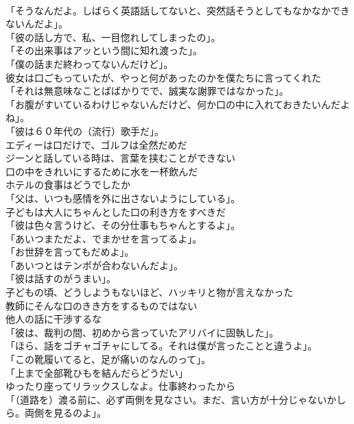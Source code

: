 \documentclass[8pt]{extreport}
\begin{document}
\begin{CJK}{UTF8}{min}
\\	「そうなんだよ。しばらく英語話してないと、突然話そうとしてもなかなかできないんだよ」。	
\\	「彼の話し方で、私、一目惚れしてしまったの」。	
\\	「その出来事はアッという間に知れ渡った」。	
\\	「僕の話まだ終わってないんだけど」。	
\\	彼女は口ごもっていたが、やっと何があったのかを僕たちに言ってくれた	
\\	「それは無意味なことばばかりでで、誠実な謝罪ではなかった」。	
\\	「お腹がすいているわけじゃないんだけど、何か口の中に入れておきたいんだよね」。	
\\	「彼は６０年代の（流行）歌手だ」。	
\\	エディーは口だけで、ゴルフは全然だめだ	
\\	ジーンと話している時は、言葉を挟むことができない	
\\	口の中をきれいにするために水を一杯飲んだ	
\\	ホテルの食事はどうでしたか	
\\	「父は、いつも感情を外に出さないようにしている」。	
\\	子どもは大人にちゃんとした口の利き方をすべきだ	
\\	「彼は色々言うけど、その分仕事もちゃんとするよ」。	
\\	「あいつまただよ、でまかせを言ってるよ」。	
\\	「お世辞を言ってもだめよ」。	
\\	「あいつとはテンポが合わないんだよ」。	
\\	「彼は話すのがうまい」。	
\\	子どもの頃、どうしようもないほど、ハッキリと物が言えなかった	
\\	教師にそんな口のきき方をするものではない	
\\	他人の話に干渉するな	
\\	「彼は、裁判の間、初めから言っていたアリバイに固執した」。	
\\	「ほら、話をゴチャゴチャにしてる。それは僕が言ったことと違うよ」。	
\\	「この靴履いてると、足が痛いのなんのって」。	
\\	「上まで全部靴ひもを結んだらどうだい」	
\\	ゆったり座ってリラックスしなよ。仕事終わったから	
\\	「（道路を）渡る前に、必ず両側を見なさい。まだ、言い方が十分じゃないかしら。両側を見るのよ」。	

\end{CJK}
\end{document}
